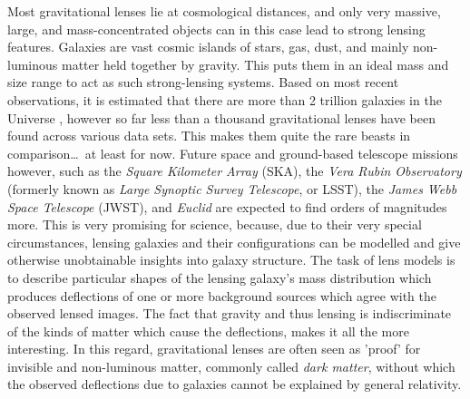 Most gravitational lenses lie at cosmological distances, and only very massive,
large, and mass-concentrated objects can in this case lead to strong lensing
features.  Galaxies are vast cosmic islands of stars, gas, dust, and mainly
non-luminous matter held together by gravity.  This puts them in an ideal mass
and size range to act as such strong-lensing systems.  Based on most recent
observations, it is estimated that there are more than 2 trillion galaxies in
the Universe , however so far less than a thousand
gravitational lenses have been found across various data sets.  This makes them
quite the rare beasts in comparison\dots\ at least for now.  Future space and
ground-based telescope missions however, such as the \textit{Square Kilometer
Array} (SKA), the \textit{Vera Rubin Observatory} (formerly known as
\textit{Large Synoptic Survey Telescope}, or LSST), the \textit{James Webb Space
Telescope} (JWST), and \textit{Euclid} are expected to find orders of magnitudes
more.  This is very promising for science, because, due to their very special
circumstances, lensing galaxies and their configurations can be modelled and
give otherwise unobtainable insights into galaxy structure. The task of lens
models is to describe particular shapes of the lensing galaxy's mass
distribution which produces deflections of one or more background sources which
agree with the observed lensed images.  The fact that gravity and thus lensing
is indiscriminate of the kinds of matter which cause the deflections, makes it
all the more interesting.  In this regard, gravitational lenses are often seen
as 'proof' for
invisible and non-luminous matter, commonly called \textit{dark matter}, without
which the observed deflections due to galaxies cannot be explained by general
relativity.

